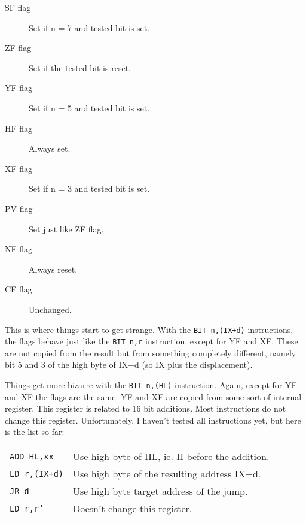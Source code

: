 \documentclass[12pt,twoside,openright,a4paper]{book}
\begin{document}
\begin{description}
	\item[SF flag]
	Set if n = 7 and tested bit is set.

	\item[ZF flag]
	Set if the tested bit is reset.

	\item[YF flag]
	Set if n = 5 and tested bit is set.

	\item[HF flag]
	Always set.

	\item[XF flag]
	Set if n = 3 and tested bit is set.

	\item[PV flag]
	Set just like ZF flag.

	\item[NF flag]
	Always reset. 

	\item[CF flag]
	Unchanged.

\end{description}

This is where things start to get strange. With the {\tt BIT n,(IX+d)} instructions, the flags behave just like the {\tt BIT n,r} instruction, except for YF and XF. These are not copied from the result but from something completely different, namely bit 5 and 3 of the high byte of IX+d (so IX plus the displacement).

Things get more bizarre with the {\tt BIT n,(HL)} instruction. Again, except for YF and XF the flags are the same. YF and XF are copied from some sort of internal register. This register is related to 16 bit additions. Most instructions do not change this register. Unfortunately, I haven't tested all instructions yet, but here is the list so far:

\begin{tabularx}{\linewidth}{@{}lX}
	{\tt ADD HL,xx}
		& Use high byte of HL, ie. H before the addition. \\

	{\tt LD r,(IX+d)}
		& Use high byte of the resulting address IX+d. \\

	{\tt JR d}
		& Use high byte target address of the jump. \\

	{\tt LD r,r'}
		& Doesn't change this register. \\
\end{tabularx}
\end{document}

